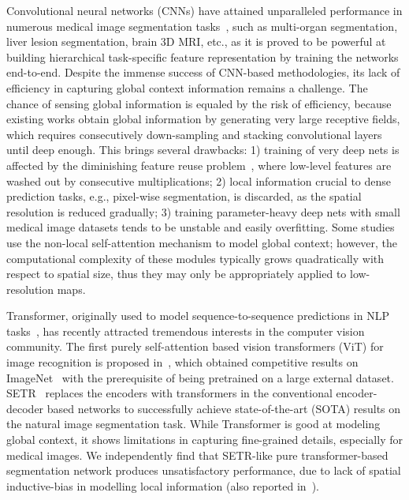 \documentclass[runningheads]{llncs}
\begin{document}
Convolutional neural networks (CNNs) have attained unparalleled performance in numerous medical image segmentation tasks~\cite{hesamian2019deep,isensee2019automated},  
such as multi-organ segmentation, liver lesion segmentation, brain 3D MRI, etc., as it is proved to be powerful at building hierarchical task-specific feature representation by training the networks end-to-end. 
Despite the immense success of CNN-based methodologies, its lack of efficiency in capturing global context information remains a challenge. The chance of sensing global information is equaled by the risk of efficiency, because existing works obtain global information by generating very large receptive fields, which requires consecutively down-sampling and stacking convolutional layers until deep enough. This brings several drawbacks: 1) training of very deep nets is affected by the diminishing feature reuse problem~\cite{srivastava2015highway}, where low-level features are washed out by consecutive multiplications; 2) local information crucial to dense prediction tasks, e.g., pixel-wise segmentation, is discarded, as the spatial resolution is reduced gradually; 3) training parameter-heavy deep nets with small medical image datasets tends to be unstable and easily overfitting. 
Some studies~\cite{wang2018non} use the non-local self-attention mechanism to model global context; however, the computational complexity of these modules typically grows quadratically with respect to spatial size, thus they may only be appropriately applied to low-resolution maps.

Transformer, originally used to model sequence-to-sequence predictions in NLP tasks~\cite{vaswani2017attention}, has recently attracted tremendous interests in the computer vision community. The first purely self-attention based vision transformers (ViT) for image recognition is proposed in~\cite{dosovitskiy2020image}, which obtained competitive results on ImageNet~\cite{deng2009imagenet} with the prerequisite of being pretrained on a large external dataset. 
SETR~\cite{zheng2020rethinking} replaces the encoders with transformers in the conventional encoder-decoder based networks to successfully achieve state-of-the-art (SOTA) results on the natural image segmentation task. While Transformer is good at modeling global context, it shows limitations in capturing fine-grained details, especially for medical images. We independently find that SETR-like pure transformer-based segmentation network produces unsatisfactory performance, due to lack of spatial inductive-bias in modelling local information (also reported in~\cite{chen2021transunet}).
\end{document}
